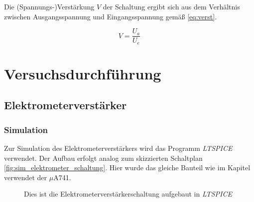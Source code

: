 \documentclass[12pt,english,ngerman]{scrartcl}
\begin{document}
Die (Spannungs-)Verstärkung $V$ der Schaltung ergibt sich aus dem Verhältnis
zwischen Ausgangsspannung und Eingangsspannung gemäß \autoref{eq:verst}.

\begin{equation}
	V=\frac{U_a}{U_e}
	\label{eq:verst}
\end{equation}

\section{Versuchsdurchführung}\label{sec:Versuchsdurchf}

\subsection{Elektrometerverstärker}

\subsubsection{Simulation} \label{sec:Versuchsim}

Zur Simulation des Elektrometerverstärkers wird das Programm
\textit{LTSPICE} verwendet. Der Aufbau erfolgt analog zum skizzierten
Schaltplan \autoref{fig:sim_elektrometer_schaltung}. Hier wurde das gleiche
Bauteil wie im Kapitel  verwendet der $\mu$A741.

\begin{figure}[H]
  \centering
  \caption{Dies ist die Elektrometerverstärkerschaltung aufgebaut in \textit{LTSPICE}}
  \label{fig:sim_elektrometer_schaltung}
\end{figure}
\end{document}
